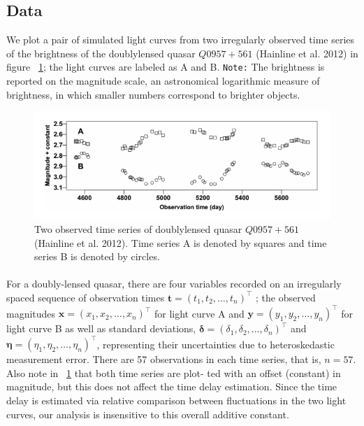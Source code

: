 \documentclass{article}
\begin{document}
\subsection*{Data}
We plot a pair of simulated light curves from
two irregularly observed time series of the
brightness of the doublylensed quasar $Q0957 + 561$ (Hainline
et al. 2012) in figure ~\ref{fig:exa4.0}; the light curves are labeled as A and B. \texttt{Note:} The brightness is reported on
the magnitude scale, an astronomical logarithmic measure of brightness, in
which smaller numbers correspond to brighter objects.
\begin{figure}
    \centering
    \includegraphics[width=\textwidth]{exa4-image.png}
    \caption{ Two observed time series of doublylensed quasar $Q0957 + 561$ (Hainline
et al. 2012). Time series A is denoted by squares and time series B is denoted by circles.}
    \label{fig:exa4.0}
\end{figure}
\paragraph{}For a doubly-lensed quasar, there are four variables recorded on an irregularly spaced sequence of observation times $\boldsymbol{t} = (t_1 , t_2, \ldots, t_n)^\top$ ; the observed
magnitudes $\boldsymbol{x} = (x_1 , x_2, \ldots , x_n )^\top$ for light curve A and $\boldsymbol{y} = (y_1 , y_2 , \ldots, y_n )^\top$
for light curve B as well as standard deviations, $\boldsymbol{\delta} = (\delta_1 , \delta_2, \ldots, \delta_n )^\top$ and
$\boldsymbol{\eta} = (\eta_1 , \eta_2 , \ldots , \eta_n)^\top$, representing their uncertainties due to heteroskedastic measurement error. There are
57 observations in each time series, that is, $n = 57$. Also note in ~\ref{fig:exa4.0} that both time series are plot-
ted with an offset (constant) in magnitude, but this does not affect the time delay
estimation. Since the time delay is estimated via relative comparison between fluctuations in the two light curves, our analysis is insensitive
to this overall additive constant.
\end{document}
